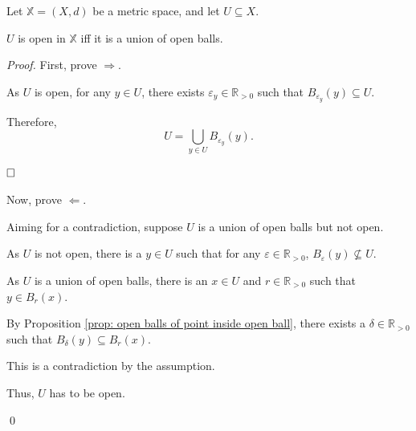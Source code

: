 \begin{proposition}
	\label{prop: set is open iff union of open balls}
	Let $\mathbb X = (X, d)$ be a metric space, and let $U \subseteq X$.
	
	$U$ is open in $\mathbb X$ iff it is a union of open balls.
	
	\begin{proof}
		First, prove $\Rightarrow$.
		
		As $U$ is open, for any $y \in U$, there exists $\varepsilon_y \in \mathbb R_{> 0}$ such that $B_{\varepsilon_y}(y) \subseteq U$.
		
		Therefore,
		$$
		U = \bigcup_{y \in U} B_{\varepsilon_y} (y).
		$$
		
		$\qedlm$
		
		Now, prove $\Leftarrow$.
		
		Aiming for a contradiction, suppose $U$ is a union of open balls but not open.
		
		As $U$ is not open, there is a $y \in U$ such that for any $\varepsilon \in \mathbb R_{> 0}$, $B_\varepsilon (y) \not \subseteq U$.
		
		As $U$ is a union of open balls, there is an $x \in U$ and $r \in \mathbb R_{> 0}$ such that $y \in B_r (x)$.
		
		By Proposition \ref{prop: open balls of point inside open ball}, there exists a $\delta \in \mathbb R_{> 0}$ such that $B_\delta (y) \subseteq B_r (x)$.
		
		This is a contradiction by the assumption.
		
		Thus, $U$ has to be open.
		
		\qed
	\end{proof}
\end{proposition}


